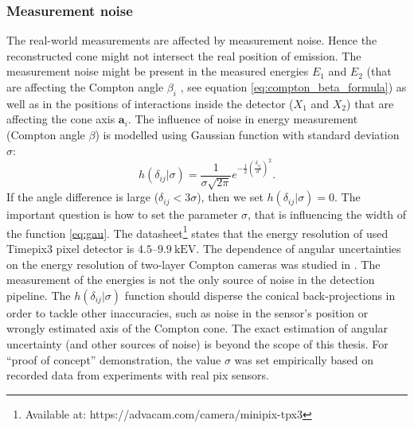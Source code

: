 \subsubsection{Measurement noise}
The real-world measurements are affected by measurement noise. Hence the reconstructed cone might not intersect the real position of emission.
The measurement noise might be present in the measured energies $E_{1}$ and $E_{2}$ (that are affecting the Compton angle $\beta_{i}$ , see equation \ref{eq:compton_beta_formula}) 
as well as in the positions of interactions inside the detector ($X_{1}$ and $X_{2}$) 
that are affecting the cone axis $\mathbf{a}_{i}$.
The influence of noise in energy measurement (Compton angle $\beta$) is modelled using Gaussian function with standard deviation $\sigma$:
\begin{equation}
  h(\delta_{ij}|\sigma) = \frac{1}{\sigma\sqrt{2\pi}}e^{-\frac{1}{2}(\frac{\delta_{ij}}{\sigma})^{2}}.
  \label{eq:gau}
\end{equation}
If the angle difference is large ($\delta_{ij}<3\sigma$), then we set $h(\delta_{ij}|\sigma) = 0$.
The important question is how to set the parameter $\sigma$, that is influencing the width of the function \ref{eq:gau}.
The datasheet\footnote{Available at: https://advacam.com/camera/minipix-tpx3}
states that the energy resolution of used Timepix3 pixel detector is $4.5$--$9.9\ \mathrm{kEV}$. 
The dependence of angular uncertainties on the energy resolution of two-layer Compton cameras was studied in \cite{ordonez}.
The measurement of the energies is not the only source of noise in the detection pipeline.
The $h(\delta_{ij}|\sigma)$ function should disperse the conical back-projections in order to tackle other inaccuracies, such as noise in the sensor's position or wrongly estimated axis of the Compton cone. 
The exact estimation of angular uncertainty (and other sources of noise) is beyond the scope of this thesis.
For ``proof of concept'' demonstration, the value $\sigma$ was set empirically based on recorded data from experiments with real \ac{pix} sensors.

